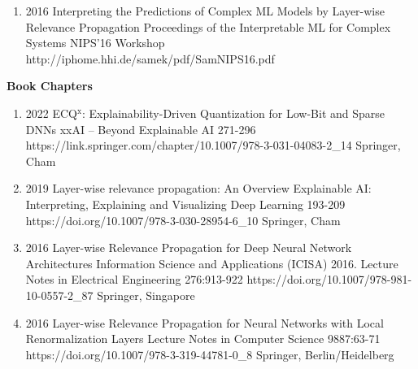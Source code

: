 \documentclass[10pt,a4paper]{article} %
\begin{document}
{\begin{enumerate}
        \item {}
                                {2016}
                                {Interpreting the Predictions of Complex ML Models by Layer-wise Relevance Propagation}
                                {Proceedings of the Interpretable ML for Complex Systems NIPS'16 Workshop}
                                {}
                                {http://iphome.hhi.de/samek/pdf/SamNIPS16.pdf}

    \end{enumerate}
}

\headedsection %
{\bf Book Chapters}{}
{
    \begin{enumerate}
        \item {}
                            {2022}
                            {ECQ$^{\textrm{x}}$: Explainability-Driven Quantization for Low-Bit and Sparse DNNs}
                            {xxAI -- Beyond Explainable AI}
                            {271-296}
                            {https://link.springer.com/chapter/10.1007/978-3-031-04083-2_14}
                            {Springer, Cham}

        \item {}
                            {2019}
                            {Layer-wise relevance propagation: An Overview}
                            {Explainable AI: Interpreting, Explaining and Visualizing Deep Learning}
                            {193-209}
                            {https://doi.org/10.1007/978-3-030-28954-6_10}
                            {Springer, Cham}

        \item {}
                            {2016}
                            {Layer-wise Relevance Propagation for Deep Neural Network Architectures}
                            {Information Science and Applications (ICISA) 2016. Lecture Notes in Electrical Engineering}
                            {276:913-922}
                            {https://doi.org/10.1007/978-981-10-0557-2_87}
                            {Springer, Singapore}

        \item {}
                            {2016}
                            {Layer-wise Relevance Propagation for Neural Networks with Local Renormalization Layers}
                            {Lecture Notes in Computer Science}
                            {9887:63-71}
                            {https://doi.org/10.1007/978-3-319-44781-0_8}
                            {Springer, Berlin/Heidelberg}
    \end{enumerate}

}
\end{document}
